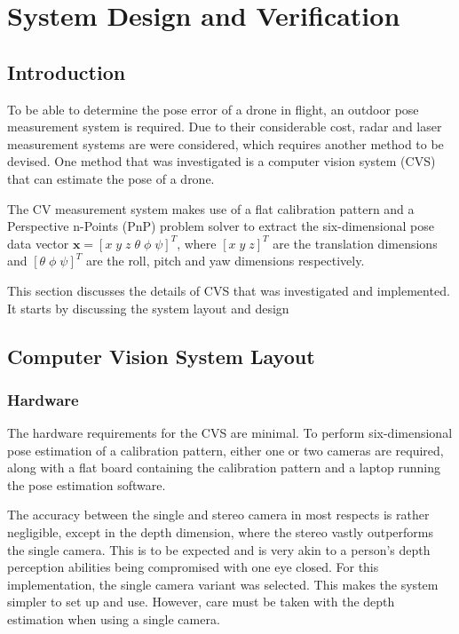 \chapter{System Design and Verification}

\section{Introduction}

To be able to determine the pose error of a drone in flight, an outdoor pose measurement system is required. Due to their considerable cost, radar and laser measurement systems are were considered, which requires another method to be devised. One method that was investigated is a computer vision system (CVS) that can estimate the pose of a drone.

The CV measurement system makes use of a flat calibration pattern and a Perspective n-Points (PnP) problem solver to extract the six-dimensional pose data vector $\bm{x} = {[x\;y\;z\;\theta\;\phi\;\psi]}^T$, where ${[x\;y\;z]}^T$ are the translation dimensions and ${[\theta\;\phi\;\psi]}^T$ are the roll, pitch and yaw dimensions respectively. 

This section discusses the details of CVS that was investigated and implemented. It starts by discussing the system layout and design

\section{Computer Vision System Layout}

\subsection{Hardware}

The hardware requirements for the CVS are minimal. To perform six-dimensional pose estimation of a calibration pattern, either one or two cameras are required, along with a flat board containing the calibration pattern and a laptop running the pose estimation software. 

The accuracy between the single and stereo camera in most respects is rather negligible, except in the depth dimension, where the stereo vastly outperforms the single camera. This is to be expected and is very akin to a person's depth perception abilities being compromised with one eye closed. For this implementation, the single camera variant was selected. This makes the system simpler to set up and use. However, care must be taken with the depth estimation when using a single camera.

